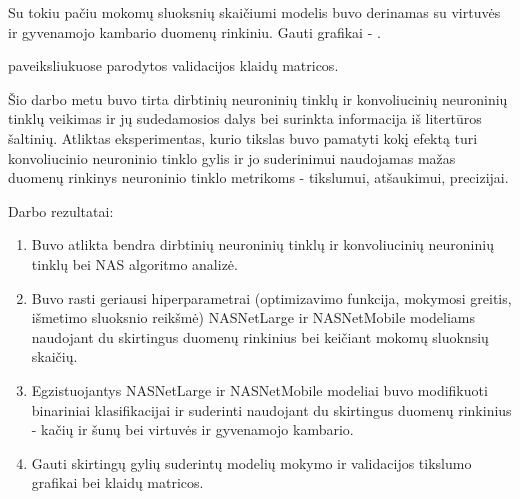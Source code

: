 \documentclass{VUMIFPSbakalaurinis}
\begin{document}
Su tokiu pačiu mokomų sluoksnių skaičiumi modelis buvo derinamas su virtuvės ir gyvenamojo kambario duomenų rinkiniu. Gauti grafikai - .

paveiksliukuose parodytos validacijos klaidų matricos. 

Šio darbo metu buvo tirta dirbtinių neuroninių tinklų ir konvoliucinių neuroninių tinklų veikimas 
ir jų sudedamosios dalys bei surinkta informacija iš litertūros šaltinių. Atliktas eksperimentas, 
kurio tikslas buvo pamatyti kokį efektą turi konvoliucinio neuroninio tinklo gylis ir jo suderinimui 
naudojamas mažas duomenų rinkinys neuroninio tinklo metrikoms - tikslumui, atšaukimui, precizijai.

Darbo rezultatai:
\begin{enumerate}
    \item Buvo atlikta bendra dirbtinių neuroninių tinklų ir konvoliucinių neuroninių tinklų bei NAS algoritmo analizė.
    \item Buvo rasti geriausi hiperparametrai (optimizavimo funkcija, mokymosi greitis, išmetimo sluoksnio reikšmė) NASNetLarge ir NASNetMobile modeliams naudojant du skirtingus duomenų rinkinius bei keičiant mokomų sluoknsių skaičių.
    \item Egzistuojantys NASNetLarge ir NASNetMobile modeliai buvo modifikuoti binariniai klasifikacijai ir suderinti naudojant du skirtingus duomenų rinkinius - kačių ir šunų bei virtuvės ir gyvenamojo kambario.
    \item Gauti skirtingų gylių suderintų modelių mokymo ir validacijos tikslumo grafikai bei klaidų matricos.
\end{enumerate}


\printbibliography[heading=bibintoc]

\appendix
\end{document}
